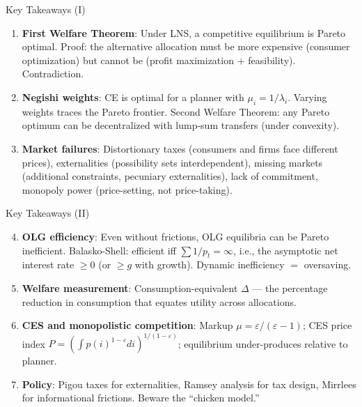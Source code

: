 \documentclass[blue]{beamer}
\begin{document}
\begin{frame}{Key Takeaways (I)}
	\begin{enumerate}
		\item \textbf{First Welfare Theorem}: Under LNS, a competitive equilibrium is Pareto optimal. Proof: the alternative allocation must be more expensive (consumer optimization) but cannot be (profit maximization $+$ feasibility). Contradiction.
		
		\item \textbf{Negishi weights}: CE is optimal for a planner with $\mu_i = 1/\lambda_i$. Varying weights traces the Pareto frontier. Second Welfare Theorem: any Pareto optimum can be decentralized with lump-sum transfers (under convexity).
		
		\item \textbf{Market failures}: Distortionary taxes (consumers and firms face different prices), externalities (possibility sets interdependent), missing markets (additional constraints, pecuniary externalities), lack of commitment, monopoly power (price-setting, not price-taking).
	\end{enumerate}
\end{frame}

\begin{frame}{Key Takeaways (II)}
	\begin{enumerate}
		\setcounter{enumi}{3}
		\item \textbf{OLG efficiency}: Even without frictions, OLG equilibria can be Pareto inefficient. Balasko-Shell: efficient iff $\sum 1/p_t = \infty$, i.e., the asymptotic net interest rate $\geq 0$ (or $\geq g$ with growth). Dynamic inefficiency $=$ oversaving.
		
		\item \textbf{Welfare measurement}: Consumption-equivalent $\Delta$ --- the percentage reduction in consumption that equates utility across allocations.
		
		\item \textbf{CES and monopolistic competition}: Markup $\mu = \varepsilon/(\varepsilon-1)$; CES price index $P = (\int p(i)^{1-\varepsilon} di)^{1/(1-\varepsilon)}$; equilibrium under-produces relative to planner.
		
		\item \textbf{Policy}: Pigou taxes for externalities, Ramsey analysis for tax design, Mirrlees for informational frictions. Beware the ``chicken model.''
	\end{enumerate}
\end{frame}
\end{document}
